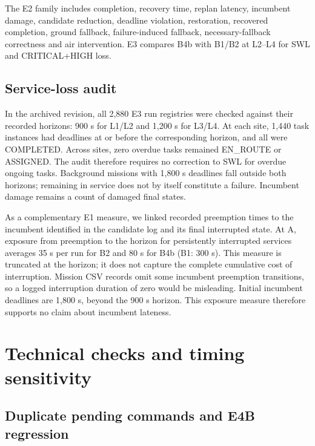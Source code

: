 \documentclass[11pt,a4paper]{article}
\begin{document}
The E2 family includes completion, recovery time, replan latency, incumbent damage, candidate reduction, deadline violation, restoration, recovered completion, ground fallback, failure-induced fallback, necessary-fallback correctness and air intervention. E3 compares B4b with B1/B2 at L2--L4 for SWL and CRITICAL+HIGH loss.

\begingroup
\setlength{\intextsep}{6pt}
\setlength{\belowcaptionskip}{3pt}

\endgroup

\subsection{Service-loss audit}

In the archived revision, all 2,880 E3 run registries were checked against their recorded horizons: 900 s for L1/L2 and 1,200 s for L3/L4. At each site, 1,440 task instances had deadlines at or before the corresponding horizon, and all were COMPLETED. Across sites, zero overdue tasks remained EN\_ROUTE or ASSIGNED. The audit therefore requires no correction to SWL for overdue ongoing tasks. Background missions with 1,800 s deadlines fall outside both horizons; remaining in service does not by itself constitute a failure. Incumbent damage remains a count of damaged final states.

As a complementary E1 measure, we linked recorded preemption times to the incumbent identified in the candidate log and its final interrupted state. At A, exposure from preemption to the horizon for persistently interrupted services averages 35 s per run for B2 and 80 s for B4b (B1: 300 s). This measure is truncated at the horizon; it does not capture the complete cumulative cost of interruption. Mission CSV records omit some incumbent preemption transitions, so a logged interruption duration of zero would be misleading. Initial incumbent deadlines are 1,800 s, beyond the 900 s horizon. This exposure measure therefore supports no claim about incumbent lateness.

\section{Technical checks and timing sensitivity}

\subsection{Duplicate pending commands and E4B regression}
\end{document}
